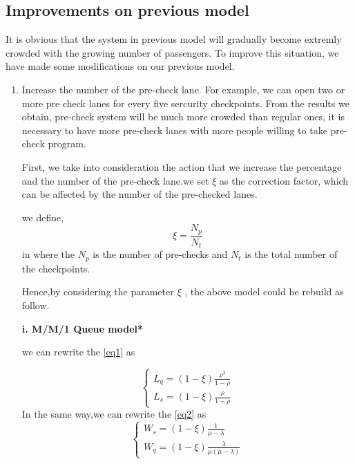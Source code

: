 \documentclass{mcmthesis}
\begin{document}
\subsection{Improvements on previous model}
	It is obvious that the system in previous model will gradually become extremly crowded with the growing number of passengers. To improve this situation, we have made some modifications on our previous model. 
	\begin{enumerate}
		\item Increase the number of the pre-check lane. For example, we can open two or more pre check lanes for every five sercurity checkpoints. From the results we obtain, pre-check system will be much more crowded than regular ones, it is necessary to have more pre-check lanes with more people willing to take pre-check program.
\par First, we take into consideration the action that we increase the percentage and the number of the pre-check lane.we set  $\xi $ as the correction factor, which can be affected by the number of the pre-checked lanes.
	  \par  we  define,
             \begin{equation}
                \xi=\frac{N_p}{N_t}
              \end{equation}
in where the $N_p$ is the number of pre-checks and $N_t$ is the total number of the checkpoints. 

\par Hence,by considering the parameter $\xi$ ,  the above model could be rebuild as follow.
 \par  {\bf i. M/M/1 Queue model*}
  \par we can rewrite the \ref{eq1} as
                
				\begin{equation}    
					\left  \{
       						\begin{array}{lr}
			 				L_q = (1-\xi)\frac {\rho ^2}{1-\rho}\\ %
							L_s = (1-\xi)\frac{\rho}{1 - \rho}
  					      \end{array}
					\right.
				\end{equation}
			 In the same way,we can rewrite the \ref{eq2} as
				\begin{equation}    
					\left  \{
       						\begin{array}{lr}
       							W_s = (1-\xi)\frac{1}{\mu - \lambda}\\  %
       							W_q = (1-\xi)\frac{\lambda}{\mu (\mu - \lambda)}
  					      \end{array}
					\right.
				\end{equation}


\end{enumerate}
\end{document}
